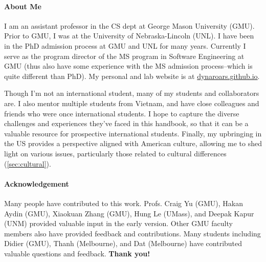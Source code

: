 \documentclass[oneside,11pt]{book}
\begin{document}
\paragraph{About Me} I am an assistant professor in the CS dept at George Mason University (GMU). Prior to GMU, I was at the University of Nebraska-Lincoln (UNL). I have been in the PhD admission process at GMU and UNL for many years.  Currently I serve as the program director of the MS program in Software Engineering at GMU (thus also have some experience with the MS admission process--which is quite different than PhD). My personal and lab website is at \href{https://dynaroars.github.io}{dynaroars.github.io}.

Though I'm not an international student, many of my students and collaborators are. I also mentor multiple students from Vietnam, and have close colleagues and friends who were once international students. I hope to capture the diverse challenges and experiences they've faced in this handbook, so that it  can be a valuable resource for prospective international students.
Finally, my upbringing in the US provides a perspective aligned with American culture, allowing me to shed light on various issues, particularly those related to cultural differences (\autoref{sec:cultural}).




\paragraph{Acknowledgement} Many people have contributed to this work.
Profs. Craig Yu (GMU), Hakan Aydin (GMU), 
Xiaokuan Zhang (GMU), Hung Le (UMass), and Deepak Kapur (UNM) provided valuable input in the early version. Other GMU faculty members also have provided feedback and contributions.  Many students including Didier (GMU), Thanh (Melbourne), and Dat (Melbourne) have contributed valuable questions and feedback.
\textbf{Thank you!}



\end{document}
